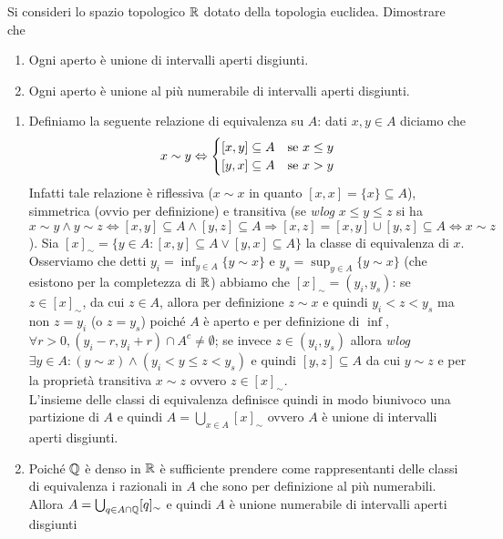 \begin{vares}
  Si consideri lo spazio topologico $ \R $ dotato della topologia euclidea. Dimostrare che
  \begin{enumerate}[label = (\roman*)]
  \item Ogni aperto è unione di intervalli aperti disgiunti.
  \item Ogni aperto è unione al più numerabile di intervalli aperti disgiunti.
  \end{enumerate}
\end{vares}
%
\begin{enumerate}[label = (\roman*)]
\item Definiamo la seguente relazione di equivalenza su $ A $: dati $ x, y \in A $ diciamo che
  \begin{equation*}
    x \sim y \iff
    \begin{cases}
      [x, y] \subseteq A & \text{se $ x \leq y $} \\
      [y, x] \subseteq A & \text{se $ x > y $}
    \end{cases}
  \end{equation*}
  Infatti tale relazione è riflessiva ($ x \sim x $ in quanto $ [x, x] = \{x\} \subseteq A $), simmetrica (ovvio per definizione) e transitiva (se \emph{wlog} $ x \leq y \leq z $ si ha $ x \sim y \wedge y \sim z \iff [x, y] \subseteq A \wedge [y, z] \subseteq A \Rightarrow [x, z] = [x, y] \cup [y, z] \subseteq A \iff x \sim z $). Sia $ [x]_{\sim} = \{y \in A : [x, y] \subseteq A \vee [y, x] \subseteq A\} $ la classe di equivalenza di $ x $. Osserviamo che detti $ y_i = \inf_{y \in A}{\{ y \sim x\}} $ e $ y_s = \sup_{y \in A}{\{y \sim x\}} $ (che esistono per la completezza di $ \R $) abbiamo che $ [x]_{\sim} = (y_i, y_s) $: se $ z \in [x]_{\sim} $, da cui $ z \in A $, allora per definizione $ z \sim x $ e quindi $ y_i  < z < y_s $ ma non $ z = y_i $ (o $ z = y_s $) poiché $ A $ è aperto e per definizione di  $ \inf $, $ \forall r > 0, (y_i - r, y_i + r) \cap A^c \neq \emptyset $; se invece $ z \in (y_i, y_s) $ allora \emph{wlog} $ \exists y \in A :( y \sim x) \wedge (y_i < y \leq z < y_s) $ e quindi $ [y, z] \subseteq A $ da cui $ y \sim z $ e per la proprietà transitiva $ x \sim z $ ovvero $ z \in [x]_{\sim} $.\\
  L'insieme delle classi di equivalenza definisce quindi in modo biunivoco una partizione di $ A $ e quindi $ A = \bigcup_{x \in A} [x]_{\sim} $ ovvero $ A $ è unione di intervalli aperti disgiunti.
\item Poiché $ \Q $ è denso in $ \R $ è sufficiente prendere come rappresentanti delle classi di equivalenza i razionali in $ A $ che sono per definizione al più numerabili. Allora $ A = \bigcup_{q \in A \cap \Q} [q]_{\sim} $ e quindi $ A $ è unione numerabile di intervalli aperti disgiunti
\end{enumerate}

